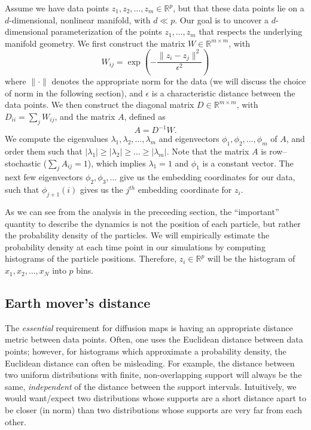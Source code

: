 \documentclass[prl, reprint, final]{revtex4-1}
\begin{document}
Assume we have data points $z_1, z_2, \dots, z_m \in \mathbb{R}^p$, but that these data points lie on a $d$-dimensional, nonlinear manifold, with $d \ll p$. 
%
Our goal is to uncover a $d$-dimensional parameterization of the points $z_1, \dots, z_m$ that respects the underlying manifold geometry.
%
We first construct the matrix $W \in \mathbb{R}^{m \times m}$, with
\begin{equation} \label{eq:W}
W_{ij} = \exp \left( -\frac{\|z_i - z_j \|^2}{\epsilon^2} \right)
\end{equation}
where $\| \cdot \|$ denotes the appropriate norm for the data (we will discuss the choice of norm in the following section), and $\epsilon$ is a characteristic distance between the data points.
%
We then construct the diagonal matrix $D \in \mathbb{R}^{m \times m}$, with $D_{ii} = \sum_j W_{ij}$, and the matrix $A$, defined as
\begin{equation}
A = D^{-1} W.
\end{equation}
%
We compute the eigenvalues $\lambda_1, \lambda_2, \dots, \lambda_m$ and eigenvectors $\phi_1, \phi_2, \dots, \phi_m$ of $A$, and order them such that $|\lambda_1| \ge |\lambda_2| \ge \dots \ge |\lambda_m|$. 
%
Note that the matrix $A$ is row--stochastic ($\sum_j A_{ij} = 1$), which implies $\lambda_1 = 1$ and $\phi_1$ is a constant vector.
%
The next few eigenvectors $\phi_2, \phi_3, \dots$ give us the embedding coordinates for our data, such that $\phi_{j+1}(i)$ gives us the $j^{th}$ embedding coordinate for $z_i$.

As we can see from the analysis in the preceeding section, the ``important'' quantity to describe the dynamics is not the position of each particle, but rather the probability density of the particles.
%
We will empirically estimate the probability density at each time point in our simulations by computing histograms of the particle positions. 
%
Therefore, $z_i \in \mathbb{R}^p$ will be the histogram of $x_1, x_2, \dots, x_N$ into $p$ bins.

\subsection{Earth mover's distance}

The {\em essential} requirement for diffusion maps is having an appropriate distance metric between data points.
%
Often, one uses the Euclidean distance between data points;
however, for histograms which approximate a probability density, the Euclidean distance can often be misleading.
%
For example, the distance between two uniform distributions with finite, non-overlapping support will always be the same, {\em independent} of the distance between the support intervals.
%
Intuitively, we would want/expect two distributions whose supports are a short distance apart to be closer (in norm) than two distributions whose supports are very far from each other.
\end{document}

